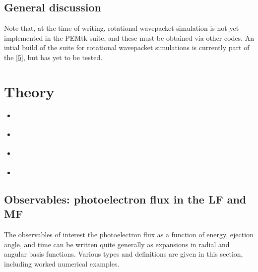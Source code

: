 \documentclass[letterpaper,table,10pt,english]{jupyterBook}
\begin{document}
\section{General discussion}
\label{\detokenize{part1/platform_intro_071122:general-discussion}}\label{\detokenize{part1/platform_intro_071122:sect-platform-general}}
\sphinxAtStartPar
Note that, at the time of writing, rotational wavepacket simulation is
not yet implemented in the PEMtk suite, and these must be obtained via
other codes. An intial build of the  suite for rotational wavepacket simulations is currently part of the  {[}\hyperlink{cite.backmatter/bibliography:id577}{5}{]}, but has yet to be tested.

\sphinxstepscope


\chapter{Theory}
\label{\detokenize{part1/theory_101122:theory}}\label{\detokenize{part1/theory_101122:chpt-theory}}\label{\detokenize{part1/theory_101122::doc}}\begin{itemize}
\item {} 
\sphinxAtStartPar
{\hyperref[\detokenize{part1/theory_observables_intro_211122::doc}]{}}

\item {} 
\sphinxAtStartPar
{\hyperref[\detokenize{part1/theory_photoionization_dynamics_191122::doc}]{}}

\item {} 
\sphinxAtStartPar
{\hyperref[\detokenize{part1/theory_tensor_formalism_201122::doc}]{}}

\item {} 
\sphinxAtStartPar
{\hyperref[\detokenize{part1/theory_info_content_221122::doc}]{}}

\end{itemize}

\sphinxstepscope


\section{Observables: photoelectron flux in the LF and MF}
\label{\detokenize{part1/theory_observables_intro_211122:observables-photoelectron-flux-in-the-lf-and-mf}}\label{\detokenize{part1/theory_observables_intro_211122:sect-theory-observables}}\label{\detokenize{part1/theory_observables_intro_211122::doc}}
\sphinxAtStartPar
The observables of interest \sphinxhyphen{} the photoelectron flux as a function of energy, ejection angle, and time \sphinxhyphen{} can be written quite generally as expansions in radial and angular basis functions. Various types and definitions are given in this section, including worked numerical examples.
\end{document}
